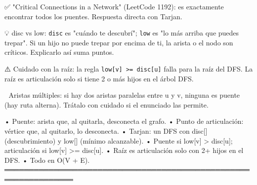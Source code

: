 \begin{dsaentrevistas}

✅ "Critical Connections in a Network" (LeetCode 1192): es exactamente
   encontrar todos los puentes. Respuesta directa con Tarjan.

💡 disc vs low: \verb|disc| es "cuándo te descubrí"; \verb|low| es "lo más
   arriba que puedes trepar". Si un hijo no puede trepar por encima de
   ti, la arista o el nodo son críticos. Explicarlo así suma puntos.

⚠️ Cuidado con la raíz: la regla \verb|low[v] >= disc[u]| falla para la
   raíz del DFS. La raíz es articulación solo si tiene 2 o más hijos en
   el árbol DFS.

🔑 Aristas múltiples: si hay dos aristas paralelas entre u y v, ninguna
   es puente (hay ruta alterna). Trátalo con cuidado si el enunciado las
   permite.

\end{dsaentrevistas}

\begin{dsaresumen}

• Puente: arista que, al quitarla, desconecta el grafo.
• Punto de articulación: vértice que, al quitarlo, lo desconecta.
• Tarjan: un DFS con disc[] (descubrimiento) y low[] (mínimo alcanzable).
• Puente si low[v] > disc[u]; articulación si low[v] >= disc[u].
• Raíz es articulación solo con 2+ hijos en el DFS.
• Todo en O(V + E).
════════════════════════════════════════════════════════════════

\end{dsaresumen}
